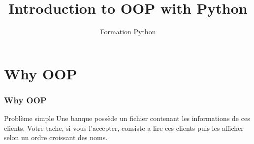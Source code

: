 \documentclass{beamer}
\title{Introduction to OOP with Python}
\author{\underline{Formation Python}}
\institute{\small  ENSAF-UEMF}
\begin{document}
\maketitle

\begin{frame}
\tableofcontents
\end{frame}
\section{Why OOP}
\begin{frame}[t]
  \frametitle{Why OOP}
  \begin{block}{Problème simple}
    Une banque possède un fichier contenant les informations de ces clients.
    Votre tache, si vous l'accepter, consiste a lire ces clients puis les
    afficher selon un ordre croissant des noms.
  \end{block}

  \begin{figure}[htpb]
  \begin{center}
  \end{center}
  \end{figure}
  
\end{frame}


\end{document}
